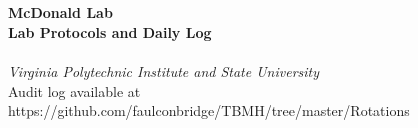 
\begin{titlepage}
	{~ \\[5cm] }
	
	\noindent \HRule \\[0.4cm]
	{ \Huge \bfseries McDonald Lab \\[0.4cm] }
	{ \huge \bfseries Lab Protocols and Daily Log \\ }
	\HRule \\[0.4cm]
	
	{ \large \emph{Virginia Polytechnic Institute and State University} }\\[11cm]
	
	\noindent Audit log available at https://github.com/faulconbridge/TBMH/tree/master/Rotations
\end{titlepage}